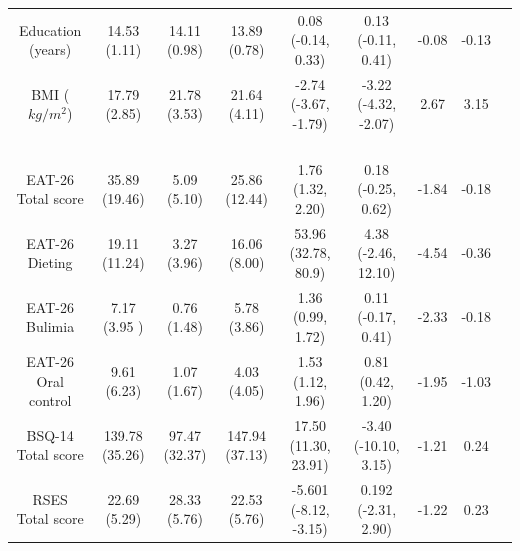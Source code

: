 \documentclass[
  man,floatsintext]{apa6}
\begin{document}
\begin{landscape}
\begin{longtable}{@{\extracolsep{\fill}} cc cc cc cc c}
    Education (years)    &   14.53 (1.11)   &   14.11 (0.98)   &   13.89 (0.78)  &   0.08 (-0.14, 0.33)   &   0.13 (-0.11, 0.41)    &   -0.08    &   -0.13  \\  
   
    BMI ($kg/m^2$)    &   17.79 (2.85)   &   21.78 (3.53)   &   21.64 (4.11)   &   -2.74 (-3.67, -1.79)   &   -3.22 (-4.32, -2.07)    &   2.67    &   3.15  \\  \\  
                                                                                                     
    &               &               &                   &   \textbf{}               &               &           \\ \hline
   
     \\  
                                                                                                     
    &               &               &                   &   \textbf{}               &               &          \\      
                                                                                                   
   
    EAT-26 Total score   &   35.89 (19.46)   &   5.09 (5.10)   &   25.86 (12.44)   &  1.76 (1.32, 2.20)  &   0.18 (-0.25, 0.62)  &  -1.84    &   -0.18 \\  
   
    EAT-26 Dieting    &   19.11 (11.24)  &  3.27 (3.96)   &  16.06 (8.00)   &   53.96 (32.78, 80.9)   &   4.38 (-2.46, 12.10)   &   -4.54  &   -0.36 \\  
   
    EAT-26 Bulimia  &   7.17 (3.95 )    &  0.76 (1.48)  &   5.78 (3.86)   &   1.36 (0.99, 1.72)  &   0.11 (-0.17, 0.41) &   -2.33  &   -0.18 \\  
   
    EAT-26 Oral control   &   9.61 (6.23)    &  1.07 (1.67)   &  4.03 (4.05) &   1.53 (1.12, 1.96)   &    0.81 (0.42, 1.20)    &   -1.95   &   -1.03 \\  
   
    BSQ-14 Total score    &   139.78 (35.26)    &   97.47 (32.37)    &   147.94 (37.13)  &    17.50 (11.30, 23.91)   &    -3.40 (-10.10, 3.15)  &  -1.21 &   0.24 \\  
   
    RSES Total score    &   22.69 (5.29)  &   28.33 (5.76)   &   22.53 (5.76)    &     -5.601 (-8.12, -3.15)  &   0.192 (-2.31, 2.90)  &  -1.22  &  0.23 \\  
                                                                                                                   

\end{longtable}
\end{landscape}
\end{document}
